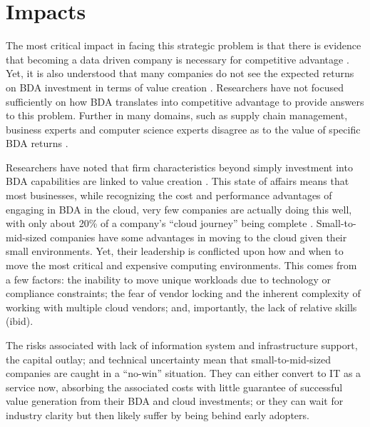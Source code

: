 \section{Impacts}

The most critical impact in facing this strategic problem is that there is evidence that becoming a data driven company is necessary for competitive advantage \parencite{alsghaierImportanceBigData2017}. Yet, it is also understood that many companies do not see the expected returns on BDA investment in terms of value creation \parencite{finkBusinessIntelligenceOrganizational2017}. Researchers have not focused sufficiently on how BDA translates into competitive advantage \parencite{trieuGettingValueBusiness2017} to provide answers to this problem. Further in many domains, such as supply chain management, business experts and computer science experts disagree as to the value of specific BDA returns \parencite{rossmannFutureSocialImpact2018}.

Researchers have noted that firm characteristics beyond simply investment into BDA capabilities are linked to value creation \parencite{bozicBusinessIntelligenceAnalytics2019}. This state of affairs means that most businesses, while recognizing the cost and performance advantages of engaging in BDA in the cloud, very few companies are actually doing this well, with only about 20\% of a company's ``cloud journey'' being complete \parencite{kenellyReasonsMostCompanies2019}. Small-to-mid-sized companies have some advantages in moving to the cloud given their small environments. Yet, their leadership is conflicted upon how and when to move the most critical and expensive computing environments. This comes from a few factors: the inability to move unique workloads due to technology or compliance constraints; the fear of vendor locking and the inherent complexity of working with multiple cloud vendors; and, importantly, the lack of relative skills (ibid).

The risks associated with lack of information system and infrastructure support, the capital outlay; and technical uncertainty \parencite{raguseoBigDataTechnologies2018} mean that small-to-mid-sized companies are caught in a ``no-win'' situation. They can either convert to IT as a service now, absorbing the associated costs with little guarantee of successful value generation from their BDA and cloud investments; or they can wait for industry clarity but then likely suffer by being behind early adopters.
